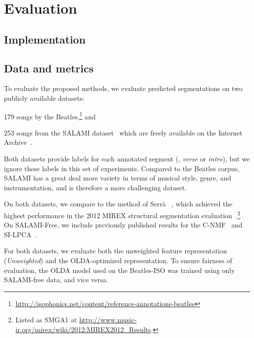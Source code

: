 \documentclass{article}
\begin{document}
\section{Evaluation}
\label{sec:eval}

\subsection{Implementation}

\subsection{Data and metrics}
To evaluate the proposed methods, we evaluate predicted segmentations on two publicly available datasets:
\begin{description}\addtolength{\itemsep}{-0.25\baselineskip}%
\item[Beatles-ISO] 179 songs by the
Beatles,\footnote{\url{http://isophonics.net/content/reference-annotations-beatles}} and
\item[SALAMI-free] 253 songs from the SALAMI dataset~\cite{smith2011design} which are freely available on the 
Internet Archive~\cite{nieto2013convex}.
\end{description}
Both datasets provide labels for each annotated segment (\eg, \emph{verse} or \emph{intro}), but we ignore these
labels in this set of experiments. Compared to the Beatles corpus, SALAMI has a great deal more variety in terms of
musical style, genre, and instrumentation, and is therefore a more challenging dataset.

On both datasets, we compare to the method of Serr\`{a} \etal~\cite{serra2012unsupervised}, which achieved the
highest performance in the 2012 MIREX structural segmentation evaluation~\cite{Downie2008}.\footnote{Listed as SMGA1
at \url{http://www.music-ir.org/mirex/wiki/2012:MIREX2012\_Results}.}  On SALAMI-Free, we include previously
published results for the C-NMF~\cite{nieto2013convex} and SI-LPCA~\cite{weiss2011unsupervised}.

For both datasets, we evaluate both the unweighted feature representation (\emph{Unweighted}) and the OLDA-optimized
representation. To ensure fairness of evaluation, the OLDA model used on the Beatles-ISO was trained using only
SALAMI-free data, and vice versa.
\end{document}
